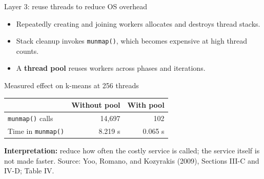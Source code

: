 \documentclass[aspectratio=169,11pt]{beamer}
\newcommand{\src}[1]{\vfill{\tiny\color{gray}Source: Yoo, Romano, and Kozyrakis (2009), #1.}}
\begin{document}
\begin{frame}{Layer 3: reuse threads to reduce OS overhead}
\begin{itemize}
\item Repeatedly creating and joining workers allocates and destroys thread stacks.
\item Stack cleanup invokes \texttt{munmap()}, which becomes expensive at high thread counts.
\item A \textbf{thread pool} reuses workers across phases and iterations.
\end{itemize}
\begin{block}{Measured effect on k-means at 256 threads}
\centering
\begin{tabular}{lrr}
\toprule & Without pool & With pool\\\midrule
\texttt{munmap()} calls & 14,697 & 102\\
Time in \texttt{munmap()} & 8.219 s & 0.065 s\\\bottomrule
\end{tabular}
\end{block}
\textbf{Interpretation:} reduce how often the costly service is called; the service itself is not made faster.
\src{Sections III-C and IV-D; Table IV}
\end{frame}
\end{document}

